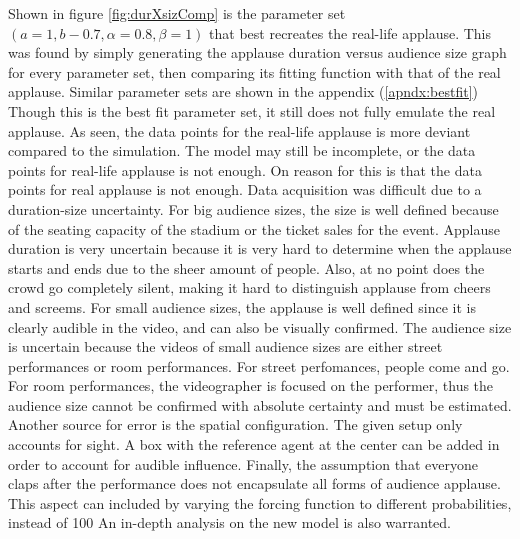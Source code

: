 Shown in figure \ref{fig:durXsizComp} is the parameter set $(a=1,b-0.7,\alpha=0.8,\beta=1)$ that best recreates the real-life applause. 
This was found by simply generating the applause duration versus audience size graph for every parameter set, then comparing its fitting function with that of the real applause. 
Similar parameter sets are shown in the appendix (\ref{apndx:bestfit})
Though this is the best fit parameter set, it still does not fully emulate the real applause.
As seen, the data points for the real-life applause is more deviant compared to the simulation.
The model may still be incomplete, or the data points for real-life applause is not enough.
On reason for this is that the data points for real applause is not enough.
Data acquisition was difficult due to a duration-size uncertainty.
For big audience sizes, the size is well defined because of the seating capacity of the stadium or the ticket sales for the event. 
Applause duration is very uncertain because it is very hard to determine when the applause starts and ends due to the sheer amount of people.
Also, at no point does the crowd go completely silent, making it hard to distinguish applause from cheers and screems.
For small audience sizes, the applause is well defined since it is clearly audible in the video, and can also be visually confirmed.
The audience size is uncertain because the videos of small audience sizes are either street performances or room performances.
For street perfomances, people come and go.
For room performances, the videographer is focused on the performer, thus the audience size cannot be confirmed with absolute certainty and must be estimated.
Another source for error is the spatial configuration. 
The given setup only accounts for sight. A box with the reference agent at the center can be added in order to account for audible influence.
Finally, the assumption that everyone claps after the performance does not encapsulate all forms of audience applause.
This aspect can included by varying the forcing function to different probabilities, instead of 100%
An in-depth analysis on the new model is also warranted.

